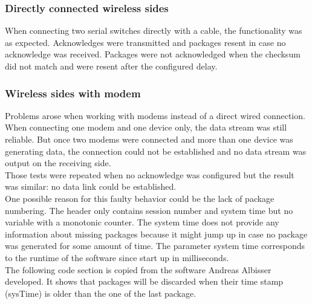 \subsubsection{Directly connected wireless sides}
When connecting two serial switches directly with a cable, the functionality was as expected. Acknowledges were transmitted and packages resent in case no acknowledge was received. Packages were not acknowledged when the checksum did not match and were resent after the configured delay. \\
%
\subsubsection{Wireless sides with modem}
Problems arose when working with modems instead of a direct wired connection. When connecting one modem and one device only, the data stream was still reliable. But once two modems were connected and more than one device was generating data, the connection could not be established and no data stream was output on the receiving side. \\
Those tests were repeated when no acknowledge was configured but the result was similar: no data link could be established. \\
One possible reason for this faulty behavior could be the lack of package numbering. The header only contains session number and system time but no variable with a monotonic counter. The system time does not provide any information about missing packages because it might jump up in case no package was generated for some amount of time. The parameter system time corresponds to the runtime of the software since start up in milliseconds.\\
The following code section is copied from the software Andreas Albisser developed. It shows that packages will be discarded when their time stamp (sysTime) is older than the one of the last package.
%
